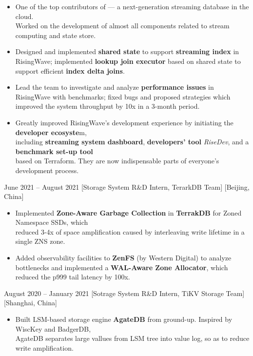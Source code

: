 \documentclass{chicv}
\begin{document}
\begin{itemize}
  \item One of the top contributors of  — a next-generation streaming database in the cloud. \\ Worked on the development of almost all components related to stream computing and state store.
  \item Designed and implemented \textbf{shared state} to support \textbf{streaming index} in RisingWave; implemented \textbf{lookup join executor} based on shared state to support efficient \textbf{index delta joins}.
  \item Lead the team to investigate and analyze \textbf{performance issues} in RisingWave with benchmarks; fixed bugs and proposed strategies which improved the system throughput by 10x in a 3-month period.
  \item Greatly improved RisingWave’s development experience by initiating the \textbf{developer ecosyste}m, \\including \textbf{streaming system dashboard}, \textbf{developers’ tool} \textit{RiseDev}, and a \textbf{benchmark set-up tool} \\based on Terraform. They are now indispensable parts of everyone’s development process.
\end{itemize}

  {June 2021 – August 2021}
  [Storage System R\&D Intern, TerarkDB Team]
  [Beijing, China]

\begin{itemize}
  \item Implemented \textbf{Zone-Aware Garbage Collection} in \textbf{TerrakDB} for Zoned Namespace SSDs, which\\ reduced 3-4x of space amplification caused by interleaving write lifetime in a single ZNS zone.
  \item Added observability facilities to \textbf{ZenFS} (by Western Digital) to analyze bottlenecks and implemented a \textbf{WAL-Aware Zone Allocator}, which reduced the p999 tail latency by 100x.
\end{itemize}

  {August 2020 -- January 2021}
  [Sotrage System R\&D Intern, TiKV Storage Team][Shanghai, China]
  \begin{itemize}
    \item Built LSM-based storage engine \textbf{AgateDB} from ground-up. Inspired by WiscKey and BadgerDB, \\AgateDB separates large vallues from LSM tree into value log, so as to reduce write amplification.
  \end{itemize}
\end{document}
